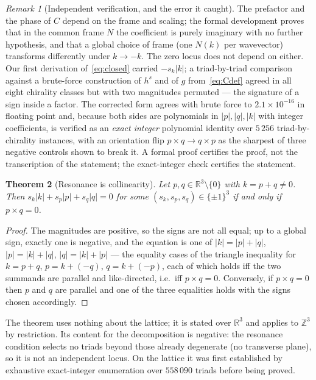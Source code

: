 \documentclass[11pt]{amsart}
\newcommand{\R}{\mathbb{R}}
\newcommand{\Z}{\mathbb{Z}}
\theoremstyle{plain}
\newtheorem{theorem}{Theorem}[section]
\theoremstyle{definition}
\theoremstyle{remark}
\newtheorem{remark}[theorem]{Remark}
\begin{document}
\begin{remark}[Independent verification, and the error it caught]
\label{rem:sign}
The prefactor and the phase of $C$ depend on the frame and scaling; the formal development proves
that in the common frame $N$ the coefficient is purely imaginary with no further hypothesis, and
that a global choice of frame (one $N(k)$ per wavevector) transforms differently under $k \to -k$.
The zero locus does not depend on either. Our first derivation of~\eqref{eq:closed} carried
$-s_k|k|$; a triad-by-triad comparison against a brute-force construction of $h^s$ and of $g$
from~\eqref{eq:Cdef} agreed in all eight chirality classes but with two magnitudes permuted ---
the signature of a sign inside a factor. The corrected form agrees with brute force to
$2.1\times10^{-16}$ in floating point and, because both sides are polynomials in $|p|,|q|,|k|$
with integer coefficients, is verified as an \emph{exact integer} polynomial identity over $5\,256$
triad-by-chirality instances, with an orientation flip $p \times q \to q \times p$ as the sharpest
of three negative controls shown to break it. A formal proof certifies the proof, not the
transcription of the statement; the exact-integer check certifies the statement.
\end{remark}

\begin{theorem}[Resonance is collinearity]
\label{thm:reso}
Let $p, q \in \R^3\setminus\{0\}$ with $k = p + q \ne 0$. Then $s_k|k| + s_p|p| + s_q|q| = 0$ for
some $(s_k, s_p, s_q) \in \{\pm1\}^3$ if and only if $p \times q = 0$.
\end{theorem}

\begin{proof}
The magnitudes are positive, so the signs are not all equal; up to a global sign, exactly one is
negative, and the equation is one of $|k| = |p| + |q|$, $|p| = |k| + |q|$, $|q| = |k| + |p|$ ---
the equality cases of the triangle inequality for $k = p + q$, $p = k + (-q)$, $q = k + (-p)$,
each of which holds iff the two summands are parallel and like-directed, i.e.\ iff $p \times q = 0$.
Conversely, if $p \times q = 0$ then $p$ and $q$ are parallel and one of the three equalities holds
with the signs chosen accordingly.
\end{proof}

The theorem uses nothing about the lattice; it is stated over $\R^3$ and applies to $\Z^3$ by
restriction. Its content for the decomposition is negative: the resonance condition selects no
triads beyond those already degenerate (no transverse plane), so it is not an independent locus.
On the lattice it was first established by exhaustive exact-integer enumeration over $558\,090$
triads before being proved.
\end{document}
